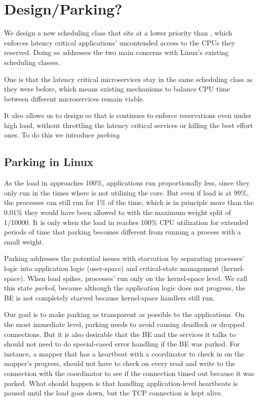\section{Design/Parking?}\label{s:design}

We design a new scheduling class \beclass{} that sits at a lower priority than
\normalclass{}, which enforces latency critical applications' uncontended access
to the CPUs they reserved. Doing so addresses the two main concerns with Linux's
existing scheduling classes. 

One is that the latency critical microservices stay in the same scheduling class
as they were before, which means existing mechanisms to balance CPU time between
different microservices remain viable.

It also allows us to design \beclass{} so that is continues to enforce
reservations even under high load, without throttling the latency critical
services or killing the best effort ones. To do this we introduce
\textit{parking}.

\subsection{Parking in Linux}

As the load in \normalclass{} approaches 100\%, \beclass{} applications run
proportionally less, since they only run in the times where \normalclass{} is
not utilizing the core. But even if \normalclass{} load is at 99\%, the
\beclass{} processes can still run for 1\% of the time, which is in principle
more than the 0.01\% they would have been allowed to with the maximum weight
split of 1/10000. It is only when the load in \normalclass{} reaches 100\% CPU
utilization for extended periods of time that parking becomes different from
running a process with a small weight.

Parking addresses the potential issues with starvation by separating \beclass{}
processes' logic into application logic (user-space) and critical-state
management (kernel-space). When load spikes, \beclass{} processes' run only on
the kernel-space level. We call this state \textit{parked}, because although the
application logic does not progress, the BE is not completely starved because
kernel-space handlers still run.

Our goal is to make parking as transparent as possible to the applications. On
the most immediate level, parking needs to avoid causing deadlock or dropped
connections. But it is also desirable that the BE and the services it talks to
should not need to do special-cased error handling if the BE was parked. For
instance, a mapper that has a heartbeat with a coordinator to check in on the
mapper's progress, should not have to check on every read and write to the
connection with the coordinator to see if the connection timed out because it
was parked. What should happen is that handling application-level heartbeats is
paused until the load goes down, but the TCP connection is kept alive. 

